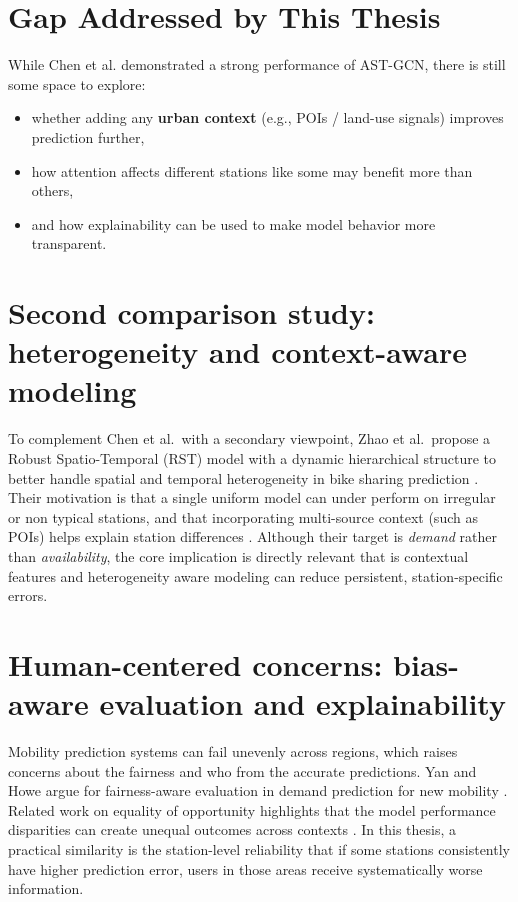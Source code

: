 \documentclass[11pt]{report}
\begin{document}
\section{Gap Addressed by This Thesis}
While Chen et al. demonstrated a strong performance of AST-GCN, there is still some space to explore:
\begin{itemize}
    \item whether adding any \textbf{urban context} (e.g., POIs / land-use signals) improves prediction further,
    \item how attention affects different stations like some may benefit more than others,
    \item and how explainability can be used to make model behavior more transparent.
\end{itemize}

\section{Second comparison study: heterogeneity and context-aware modeling}
To complement Chen et al.\ with a secondary viewpoint, Zhao et al.\ propose a Robust Spatio-Temporal (RST) model with a dynamic hierarchical structure to better handle spatial and temporal heterogeneity in bike sharing prediction \cite{zhao2025rst}. Their motivation is that a single uniform model can under perform on irregular or non typical stations, and that incorporating multi-source context (such as POIs) helps explain station differences \cite{zhao2025rst}. Although their target is \emph{demand} rather than \emph{availability}, the core implication is directly relevant that is contextual features and heterogeneity aware modeling can reduce persistent, station-specific errors.

\section{Human-centered concerns: bias-aware evaluation and explainability}
Mobility prediction systems can fail unevenly across regions, which raises concerns about the fairness and who from the accurate predictions. Yan and Howe argue for fairness-aware evaluation in demand prediction for new mobility \cite{yan2020fairness}. Related work on equality of opportunity highlights that the model performance disparities can create unequal outcomes across contexts \cite{zheng2021equality}. In this thesis, a practical similarity is the station-level reliability that if some stations consistently have higher prediction error, users in those areas receive systematically worse information.
\end{document}
